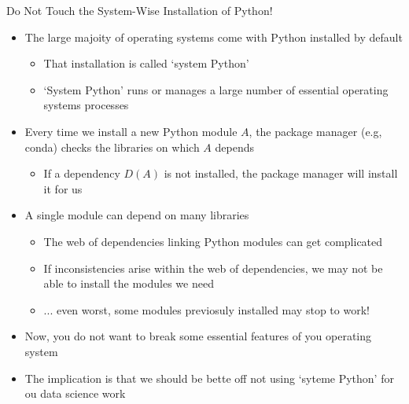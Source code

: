 \documentclass[aspectratio=1610]{beamer}
\begin{document}
\begin{frame}[c]{Do Not Touch the System-Wise Installation of Python!}
	\begin{itemize}
		\item The large majoity of operating systems come with Python installed by default
		\begin{itemize}
			\item That installation is called `system Python'
			\item `System Python' runs or manages a large number of essential operating systems processes
		\end{itemize}
		\item  Every time we install a new Python module $A$, the package manager (e.g, conda) checks the libraries on which $A$ depends
		\begin{itemize}
			\item If a dependency $D(A)$ is not installed, the package manager will install it for us
	        \end{itemize}
		\item A single module can depend on many libraries
		\begin{itemize}
			\item The web of dependencies linking Python modules can get complicated
			\item If inconsistencies arise within the web of dependencies, we may not be able to install the modules we need
			\item ... even worst, some modules previosuly installed may stop to work!
		\end{itemize}
		\item Now, you do not want to break some essential features of you operating system
		\item The implication is that we should be bette off not using `syteme Python' for ou data science work
	\end{itemize}
\end{frame}
\end{document}
